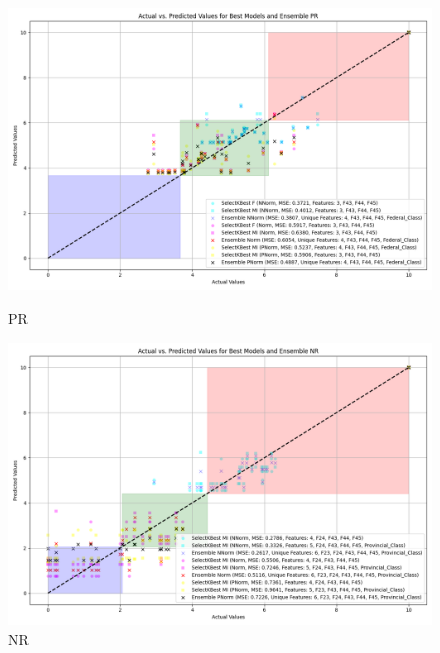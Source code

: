\begin{figure}[H]
    \centering
    \begin{minipage}{0.45\textwidth}
        \centering
        \includegraphics[width=\linewidth]{reg_section_all/featred_ensemble_learning/actual_vs_predicted_best_feature_selection_and_ensemble_PR_10.png}
        \caption{PR}
        \label{reg_all_fig:pr_featred}
    \end{minipage}\hfill
    \begin{minipage}{0.45\textwidth}
        \centering
        \includegraphics[width=\linewidth]{reg_section_all/featred_ensemble_learning/actual_vs_predicted_best_feature_selection_and_ensemble_NR_10.png}
        \caption{NR}
        \label{reg_all_fig:nr_featred}
    \end{minipage}
\end{figure}

